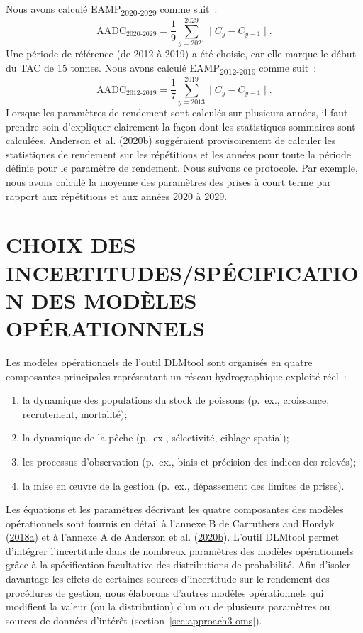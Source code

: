 \documentclass[11pt]{book}
\begin{document}
Nous avons calculé EAMP\textsubscript{2020-2029} comme suit~:
\begin{equation}
\textrm{AADC}_\textrm{2020-2029} = \dfrac{1}{9}\sum_{y=2021}^{2029} \mid C_y - C_{y-1} \mid.
\end{equation}
Une période de référence (de 2012 à 2019) a été choisie, car elle marque le début du TAC de 15 tonnes. Nous avons calculé EAMP\textsubscript{2012-2019} comme suit~:
\begin{equation}
\textrm{AADC}_\textrm{2012-2019} = \dfrac{1}{7}\sum_{y=2013}^{2019} \mid C_y - C_{y-1} \mid.
\end{equation}
Lorsque les paramètres de rendement sont calculés sur plusieurs années, il faut prendre soin d'expliquer clairement la façon dont les statistiques sommaires sont calculées. Anderson et al. (\protect\hyperlink{ref-anderson2020gfmp}{2020}\protect\hyperlink{ref-anderson2020gfmp}{b}) suggéraient provisoirement de calculer les statistiques de rendement sur les répétitions et les années pour toute la période définie pour le paramètre de rendement. Nous suivons ce protocole. Par exemple, nous avons calculé la moyenne des paramètres des prises à court terme par rapport aux répétitions et aux années 2020 à 2029.

\hypertarget{sec:om}{%
\section{CHOIX DES INCERTITUDES/SPÉCIFICATION DES MODÈLES OPÉRATIONNELS}\label{sec:om}}

Les modèles opérationnels de l'outil DLMtool sont organisés en quatre composantes principales représentant un réseau hydrographique exploité réel~:
\begin{enumerate}
\def\labelenumi{\arabic{enumi}.}

\item
  la dynamique des populations du stock de poissons (p.~ex., croissance, recrutement, mortalité);
\item
  la dynamique de la pêche (p.~ex., sélectivité, ciblage spatial);
\item
  les processus d'observation (p.~ex., biais et précision des indices des relevés);
\item
  la mise en œuvre de la gestion (p.~ex., dépassement des limites de prises).
\end{enumerate}
Les équations et les paramètres décrivant les quatre composantes des modèles opérationnels sont fournis en détail à l'annexe B de Carruthers and Hordyk (\protect\hyperlink{ref-carruthers2018}{2018}\protect\hyperlink{ref-carruthers2018}{a}) et à l'annexe A de Anderson et al. (\protect\hyperlink{ref-anderson2020gfmp}{2020}\protect\hyperlink{ref-anderson2020gfmp}{b}). L'outil DLMtool permet d'intégrer l'incertitude dans de nombreux paramètres des modèles opérationnels grâce à la spécification facultative des distributions de probabilité. Afin d'isoler davantage les effets de certaines sources d'incertitude sur le rendement des procédures de gestion, nous élaborons d'autres modèles opérationnels qui modifient la valeur (ou la distribution) d'un ou de plusieurs paramètres ou sources de données d'intérêt (section~\ref{sec:approach3-oms}).
\end{document}
